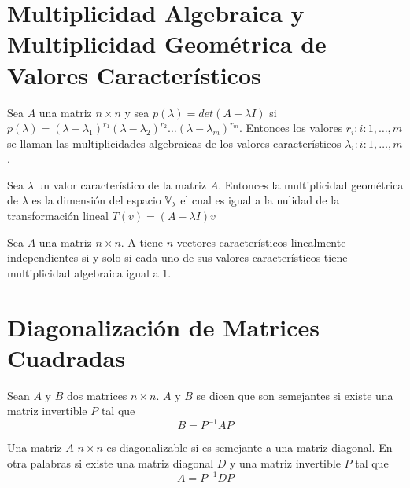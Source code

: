 \section{Multiplicidad Algebraica y Multiplicidad Geométrica de Valores Característicos}
\begin{dfn}
Sea $A$ una matriz $n \times n$ y sea $p(\lambda) = det (A - \lambda I)$ si $p(\lambda) = (\lambda - \lambda_1)^{r_1} (\lambda - \lambda_2)^{r_2} \ldots (\lambda- \lambda_m)^{r_m}$. Entonces los valores $r_i : i : 1, \ldots, m$ se llaman las multiplicidades algebraicas de los valores característicos $\lambda_i : i:1, \ldots, m$.
\end{dfn}

\begin{dfn}
Sea $\lambda$ un valor característico de la matriz $A$. Entonces la multiplicidad geométrica de $\lambda$ es la dimensión del espacio $\mathbb{V}_{\lambda}$ el cual es igual a la nulidad de la transformación lineal $T(v) = (A- \lambda I)v$
\end{dfn}

\begin{theorem}
Sea $A$ una matriz $n \times n$. A tiene $n$ vectores característicos linealmente independientes si y solo si cada uno de sus valores característicos tiene multiplicidad algebraica igual a 1.
\end{theorem}

\section{Diagonalización de Matrices Cuadradas}
\begin{dfn}
Sean $A$ y $B$ dos matrices $n \times n$. $A$ y $B$ se dicen que son semejantes si existe una matriz invertible $P$ tal que 
$$B= P^{-1} AP$$
\end{dfn}

\begin{dfn}
Una matriz $A$ $n \times n$ es diagonalizable si es semejante a una matriz diagonal. En otra palabras si existe una matriz diagonal $D$ y una matriz invertible $P$ tal que 
$$A=P^{-1}DP$$
\end{dfn}

